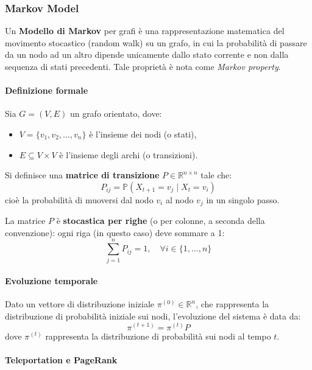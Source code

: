 \newpage

\subsubsection*{Markov Model}

Un \textbf{Modello di Markov} per grafi è una rappresentazione matematica del movimento stocastico (random walk) su un grafo, in cui la probabilità di passare da un nodo ad un altro dipende unicamente dallo stato corrente e non dalla sequenza di stati precedenti. Tale proprietà è nota come \textit{Markov property}.

\paragraph{Definizione formale}

Sia $G = (V, E)$ un grafo orientato, dove:
\begin{itemize}
    \item $V = \{v_1, v_2, \ldots, v_n\}$ è l'insieme dei nodi (o stati),
    \item $E \subseteq V \times V$ è l'insieme degli archi (o transizioni).
\end{itemize}

Si definisce una \textbf{matrice di transizione} $P \in \mathbb{R}^{n \times n}$ tale che:
\[
P_{ij} = \mathbb{P}(X_{t+1} = v_j \mid X_t = v_i)
\]
cioè la probabilità di muoversi dal nodo $v_i$ al nodo $v_j$ in un singolo passo.

La matrice $P$ è \textbf{stocastica per righe} (o per colonne, a seconda della convenzione): ogni riga (in questo caso) deve sommare a 1:
\[
\sum_{j=1}^n P_{ij} = 1, \quad \forall i \in \{1, \ldots, n\}
\]

\paragraph{Evoluzione temporale}

Dato un vettore di distribuzione iniziale $\pi^{(0)} \in \mathbb{R}^n$, che rappresenta la distribuzione di probabilità iniziale sui nodi, l'evoluzione del sistema è data da:
\[
\pi^{(t+1)} = \pi^{(t)} P
\]
dove $\pi^{(t)}$ rappresenta la distribuzione di probabilità sui nodi al tempo $t$.

\paragraph{Teleportation e PageRank}

